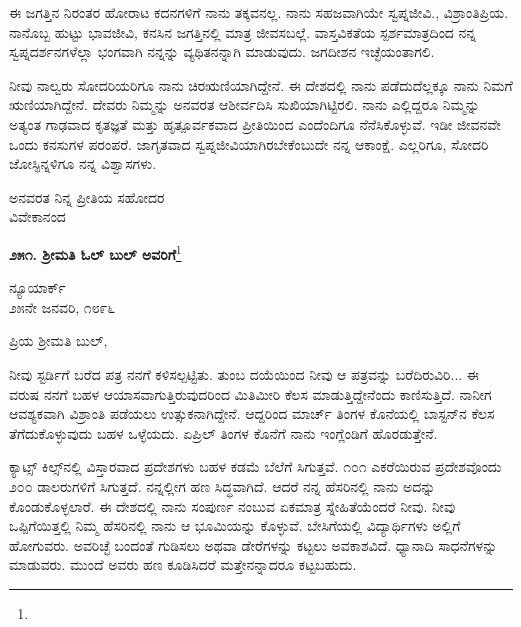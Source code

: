 ಈ ಜಗತ್ತಿನ ನಿರಂತರ ಹೋರಾಟ ಕದನಗಳಿಗೆ ನಾನು ತಕ್ಕವನಲ್ಲ. ನಾನು ಸಹಜವಾಗಿಯೇ ಸ್ವಪ್ನಜೀವಿ., ವಿಶ್ರಾಂತಿಪ್ರಿಯ. ನಾನೊಬ್ಬ ಹುಟ್ಟು ಭಾವಜೀವಿ, ಕನಸಿನ ಜಗತ್ತಿನಲ್ಲಿ ಮಾತ್ರ ಜೀವಸಬಲ್ಲೆ. ವಾಸ್ತವಿಕತೆಯ ಸ್ಪರ್ಶಮಾತ್ರದಿಂದ ನನ್ನ ಸ್ವಪ್ನದರ್ಶನಗಳೆಲ್ಲಾ ಭಂಗವಾಗಿ ನನ್ನನ್ನು ವ್ಯಥಿತನನ್ನಾಗಿ ಮಾಡುವುದು. ಜಗದೀಶನ ಇಚ್ಛೆಯಂತಾಗಲಿ.

ನೀವು ನಾಲ್ವರು ಸೋದರಿಯರಿಗೂ ನಾನು ಚಿರಋಣಿಯಾಗಿದ್ದೇನೆ. ಈ ದೇಶದಲ್ಲಿ ನಾನು ಪಡೆದುದೆಲ್ಲಕ್ಕೂ ನಾನು ನಿಮಗೆ ಋಣಿಯಾಗಿದ್ದೇನೆ. ದೇವರು ನಿಮ್ಮನ್ನು ಅನವರತ ಆಶೀರ್ವದಿಸಿ ಸುಖಿಯಾಗಿಟ್ಟಿರಲಿ. ನಾನು ಎಲ್ಲಿದ್ದರೂ ನಿಮ್ಮನ್ನು ಅತ್ಯಂತ ಗಾಢವಾದ ಕೃತಜ್ಞತೆ ಮತ್ತು ಹೃತ್ಪೂರ್ವಕವಾದ ಪ್ರೀತಿಯಿಂದ ಎಂದೆಂದಿಗೂ ನೆನೆಸಿಕೊಳ್ಳುವೆ. ಇಡೀ ಜೀವನವೇ ಒಂದು ಕನಸುಗಳ ಪರಂಪರೆ. ಜಾಗೃತವಾದ ಸ್ವಪ್ನಜೀವಿಯಾಗಿರಬೇಕೆಂಬುದೇ ನನ್ನ ಆಕಾಂಕ್ಷೆ. ಎಲ್ಲರಿಗೂ, ಸೋದರಿ ಜೋಸ್ಫಿನ್ನಳಿಗೂ ನನ್ನ ವಿಶ್ವಾಸಗಳು.

{\flushright
ಅನವರತ ನಿನ್ನ ಪ್ರೀತಿಯ ಸಹೋದರ\\ವಿವೇಕಾನಂದ\par}
\vspace{-0.3cm}

\begin{center}
\textbf{೨೫೧. ಶ‍್ರೀಮತಿ ಓಲ್ ಬುಲ್ ಅವರಿಗೆ}\footnote{}
\end{center}
\vspace{-0.5cm}

\begin{flushright}
ನ್ಯೂಯಾರ್ಕ್\\೨೫ನೇ ಜನವರಿ, ೧೮೯೬
\end{flushright}
\vspace{-0.5cm}

\noindent
ಪ್ರಿಯ ಶ‍್ರೀಮತಿ ಬುಲ್,

ನೀವು ಸ್ಟರ್ಡಿಗೆ ಬರೆದ ಪತ್ರ ನನಗೆ ಕಳಿಸಲ್ಪಟ್ಟಿತು. ತುಂಬ ದಯೆಯಿಂದ ನೀವು ಆ ಪತ್ರವನ್ನು ಬರೆದಿರುವಿರಿ... ಈ ವರುಷ ನನಗೆ ಬಹಳ ಆಯಾಸವಾಗುತ್ತಿರುವುದರಿಂದ ಮಿತಿಮೀರಿ ಕೆಲಸ ಮಾಡುತ್ತಿದ್ದೇನೆಂದು ಕಾಣಿಸುತ್ತಿದೆ. ನಾನೀಗ ಆವಶ್ಯಕವಾಗಿ ವಿಶ್ರಾಂತಿ ಪಡೆಯಲು ಉತ್ಸುಕನಾಗಿದ್ದೇನೆ. ಆದ್ದರಿಂದ ಮಾರ್ಚ್ ತಿಂಗಳ ಕೊನೆಯಲ್ಲಿ ಬಾಸ್ಟನ್‌ನ ಕೆಲಸ ತೆಗೆದುಕೊಳ್ಳುವುದು ಬಹಳ ಒಳ್ಳೆಯದು. ಏಪ್ರಿಲ್ ತಿಂಗಳ ಕೊನೆಗೆ ನಾನು ಇಂಗ್ಲೆಂಡಿಗೆ ಹೊರಡುತ್ತೇನೆ.

\vspace{0.1cm}

ಕ್ಯಾಟ್ಸ್ ಕಿಲ್ಸ್‌ನಲ್ಲಿ ವಿಸ್ತಾರವಾದ ಪ್ರದೇಶಗಳು ಬಹಳ ಕಡಮೆ ಬೆಲೆಗೆ ಸಿಗುತ್ತವೆ. ೧೦೧ ಎಕರೆಯಿರುವ ಪ್ರದೇಶವೊಂದು ೨೦೦ ಡಾಲರುಗಳಿಗೆ ಸಿಗುತ್ತದೆ. ನನ್ನಲ್ಲೀಗ ಹಣ ಸಿದ್ಧವಾಗಿದೆ. ಆದರೆ ನನ್ನ ಹೆಸರಿನಲ್ಲಿ ನಾನು ಅದನ್ನು ಕೊಂಡುಕೊಳ್ಳಲಾರೆ. ಈ ದೇಶದಲ್ಲಿ ನಾನು ಸಂಪುರ್ಣ ನಂಬುವ ಏಕಮಾತ್ರ ಸ್ನೇಹಿತೆಯೆಂದರೆ ನೀವು. ನೀವು ಒಪ್ಪಿಗೆಯಿತ್ತಲ್ಲಿ ನಿಮ್ಮ ಹೆಸರಿನಲ್ಲಿ ನಾನು ಆ ಭೂಮಿಯನ್ನು ಕೊಳ್ಳುವೆ. ಬೇಸಿಗೆಯಲ್ಲಿ ವಿದ್ಯಾರ್ಥಿಗಳು ಅಲ್ಲಿಗೆ ಹೋಗುವರು. ಅವರಿಚ್ಛೆ ಬಂದಂತೆ ಗುಡಿಸಲು ಅಥವಾ ಡೇರೆಗಳನ್ನು ಕಟ್ಟಲು ಅವಕಾಶವಿದೆ. ಧ್ಯಾನಾದಿ ಸಾಧನೆಗಳನ್ನು ಮಾಡುವರು. ಮುಂದೆ ಅವರು ಹಣ ಕೂಡಿಸಿದರೆ ಮತ್ತೇನನ್ನಾದರೂ ಕಟ್ಟಬಹುದು.

